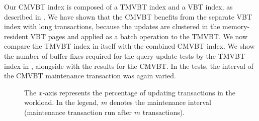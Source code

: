 Our CMVBT index is composed of a TMVBT index and a VBT index, as described in
.
We have shown that the CMVBT benefits from the separate VBT index with long
transactions, because the updates are clustered in the memory-resident VBT
pages and applied as a batch operation to the TMVBT\@.
We now compare the TMVBT index in itself with the combined CMVBT index.
We show the number of buffer fixes required for the query-update tests by
the TMVBT index in , alongside with the results for
the CMVBT\@.
In the tests, the interval of the CMVBT maintenance transaction was again
varied.

\begin{figure}[!htb]
\begin{center}
%
{The $x$-axis represents the percentage of updating transactions in the
workload. 
In the legend, $m$ denotes the maintenance interval (maintenance
transaction run after $m$ transactions).}
\label{fig:cm-initial-fix}
\end{center}
\end{figure}

